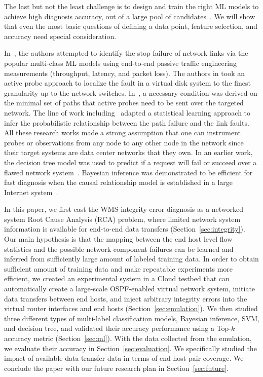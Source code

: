 The last but not the least challenge is to design and train the right ML models to achieve high diagnosis accuracy, out of a large pool of candidates~\cite{Boutaba:2018aa}. We will show that even the most basic questions of defining a data point, feature selection, and accuracy need special consideration.

In~\cite{Link-JIoT-2019}, the authors attempted to identify the stop failure of network links via the popular multi-class ML models 
using end-to-end passive traffic engineering measurements (throughput, latency, and packet loss). The authors in \cite{DeepView:NSDI18} took an active probe approach to localize the fault in a virtual disk system to the finest granularity up to the network switches. In~\cite{netbouncer:nsdi18}, a necessary condition was derived on the minimal set of paths that active probes need to be sent over the targeted network. The line of work including~\cite{KDD14,NetPoirot:Sigcomm2016} adapted a statistical learning approach to infer the probabilistic relationship between the path failure and the link faults. All these research works made a strong assumption that one can instrument probes or observations from any node to any other node in the network since their target systems are data center networks that they own. In an earlier work, the decision tree model was used to predict if a request will fail or succeed over a flawed network system~\cite{DT:2004}. Bayesian inference was demonstrated to be efficient for fast diagnosis when the causal relationship model is established in a large Internet system~\cite{BN-Internet:2007}.

In this paper, we first cast the WMS integrity error diagnosis as a networked system Root Cause Analysis (RCA) problem, where limited network system information is available for end-to-end data transfers (Section~\ref{sec:integrity}). Our main hypothesis is that the mapping between the end host level flow statistics and the possible network component failures can be learned and inferred from sufficiently large amount of labeled training data. In order to obtain sufficient amount of training data and make repeatable experiments more efficient, we created an experimental system in a Cloud testbed that can automatically create a large-scale OSPF-enabled virtual network system, initiate data transfers between end hosts, and inject arbitrary integrity errors into the virtual router interfaces and end hosts (Section~\ref{sec:emulation}). We then studied three different types of multi-label classification models, Bayesian inference, SVM, and decision tree, and validated their accuracy performance using a Top-$k$ accuracy metric (Section~\ref{sec:ml}). With the data collected from the emulation, we evaluate their accuracy in Section~\ref{sec:evaluation}. We specifically studied the impact of available data transfer data in terms of end host pair coverage. We conclude the paper with our future research plan in Section~\ref{sec:future}.
